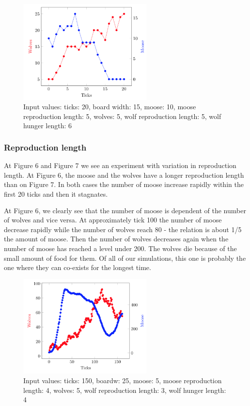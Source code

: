 \documentclass[a4paper]{report}
\begin{document}
\begin{figure}[H]
\centering
\includegraphics[width=0.60\textwidth]{Experiments/sim_hunlen_a2}
\caption{Input values: ticks: 20, board width: 15, moose: 10, moose reproduction length: 5, wolves: 5, wolf reproduction length: 5, wolf hunger length: 6}
\end{figure}


\subsubsection*{Reproduction length}
At Figure 6 and Figure 7 we see an experiment with variation in reproduction length. At Figure 6, the moose and the wolves have a longer reproduction length than on Figure 7. In both cases the number of moose increase rapidly within the first 20 ticks and then it stagnates.
 
At Figure 6, we clearly see that the number of moose is dependent of the number of wolves and vice versa. At approximately tick 100 the number of moose decrease rapidly while the number of wolves reach 80 - the relation is about 1/5 the amount of moose. Then the number of wolves decreases again when the number of moose has reached a level under 200. The wolves die because of the small amount of food for them. \newline 
Of all of our simulations, this one is probably the one where they can co-exists for the longest time.

\begin{figure}[H]
\centering
\includegraphics[width=0.60\textwidth]{Experiments/sim_rep_c1}
\caption{Input values: ticks: 150, boardw: 25, moose: 5, moose reproduction length: 4, wolves: 5, wolf reproduction length: 3, wolf hunger length: 4}
\end{figure}
\end{document}
